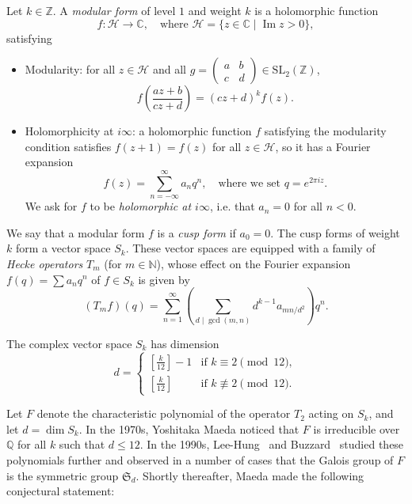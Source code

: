 \documentclass{book}
\newcommand{\longto}{\longrightarrow}
\newcommand{\CC}{\mathbb{C}}
\newcommand{\ZZ}{\mathbb{Z}}
\newcommand{\QQ}{\mathbb{Q}}
\newcommand{\NN}{\mathbb{N}}
\newcommand{\cH}{\mathcal{H}}
\renewcommand{\SS}{\mathfrak{S}}
\renewcommand{\Im}{\operatorname{Im}}
\newcommand{\SL}{\mathrm{SL}}
\begin{document}
Let $k\in\ZZ$.  A \emph{modular form} of level $1$ and weight $k$ is a
holomorphic function
\begin{equation*}
  f\colon\cH\longto\CC, \quad\text{where }
  \cH=\{z\in\CC\mid \Im z>0\},
\end{equation*}
satisfying
\begin{itemize}
  \item Modularity: for all $z\in\cH$ and all
    $g=\left(\begin{smallmatrix}a&b\\c&d\end{smallmatrix}\right)\in\SL_2(\ZZ)$,
      \begin{equation*}
        f\left(\frac{az+b}{cz+d}\right)=(cz+d)^kf(z).
      \end{equation*}
  \item Holomorphicity at $i\infty$: a holomorphic function $f$ satisfying the
    modularity condition satisfies $f(z+1)=f(z)$ for all $z\in\cH$, so it has
    a Fourier expansion
    \begin{equation*}
      f(z)=\sum_{n=-\infty}^\infty a_nq^n,\quad\text{where we set }
      q=e^{2\pi i z}.
    \end{equation*}
    We ask for $f$ to be \emph{holomorphic at $i\infty$}, i.e. that $a_n=0$
    for all $n<0$.
\end{itemize}

We say that a modular form $f$ is a \emph{cusp form} if $a_0=0$.  The cusp
forms of weight $k$ form a vector space $S_k$.  These vector spaces are
equipped with a family of \emph{Hecke operators} $T_m$ (for $m\in\NN$), whose
effect on the Fourier expansion $f(q)=\sum a_nq^n$ of $f\in S_k$ is given by
\begin{equation*}
  (T_m f)(q)=\sum_{n=1}^\infty \left(\sum_{d\mid\gcd(m,n)}d^{k-1}a_{mn/d^2}\right)q^n.
\end{equation*}

The complex vector space $S_k$ has dimension 
\begin{equation*}
  d=\begin{cases}
    \left[\frac{k}{12}\right]-1 & \text{if }k\equiv 2\pmod{12},\\
    \left[\frac{k}{12}\right] & \text{if }k\not\equiv 2\pmod{12}.
  \end{cases}
\end{equation*}

Let $F$ denote the characteristic polynomial of the operator $T_2$ acting on
$S_k$, and let $d=\dim S_k$.
In the 1970s, Yoshitaka Maeda noticed that $F$ is irreducible over $\QQ$ for
all $k$ such that $d\leq 12$.  In the 1990s, Lee-Hung~\cite{LeeHung} and
Buzzard~\cite{Buzzard} studied these polynomials further and observed in a
number of cases that the Galois group of $F$ is the symmetric group
$\SS_d$.  Shortly thereafter, Maeda made the following conjectural statement:
\end{document}
